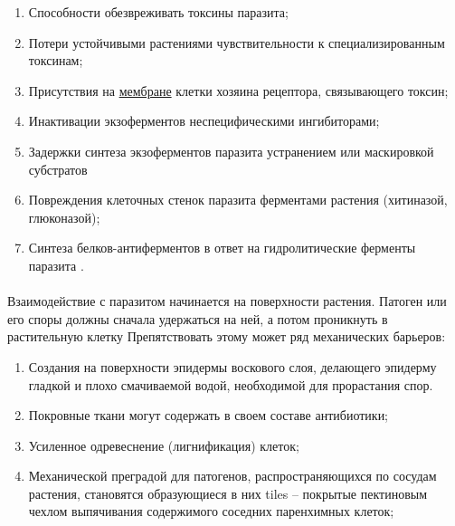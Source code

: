 \begin{enumerate}
\item Способности обезвреживать токсины паразита;
\item Потери устойчивыми растениями чувствительности к специализированным токсинам; 
\item Присутствия на \hyperlink{plasmolema}{мембране} клетки хозяина рецептора, связывающего токсин; 
\item Инактивации экзоферментов неспецифическими ингибиторами; 
\item Задержки синтеза экзоферментов паразита устранением или маскировкой субстратов
\item Повреждения клеточных стенок паразита ферментами растения (хитиназой, глюконазой); 
\item Синтеза белков-антиферментов в ответ на гидролитические ферменты паразита \cite{polevoy_89}.
\end{enumerate}

\paragraph*{}Взаимодействие с паразитом начинается на поверхности растения. Патоген или его споры должны сначала удержаться на ней, а потом проникнуть в растительную клетку Препятствовать этому может ряд механических барьеров: 

\begin{enumerate}
\item Создания на поверхности эпидермы воскового слоя, делающего эпидерму гладкой и плохо смачиваемой водой, необходимой для прорастания спор. 
\item Покровные ткани могут содержать в своем составе антибиотики;
\item Усиленное одревеснение (лигнификация) клеток;
\item Механической преградой для патогенов, распространяющихся по сосудам растения, становятся образующиеся в них \gls{tiles} -- покрытые пектиновым чехлом выпячивания содержимого соседних паренхимных клеток;
\end{enumerate}

